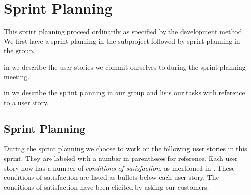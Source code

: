 \chapter{Sprint Planning}\label{chap:s4_sprintplanning}
This sprint planning proceed ordinarily as specified by the development method. We first have a sprint planning in the subproject followed by sprint planning in the group.

\begin{chapterorganization}
  \item in  we describe the user stories we commit ourselves to during the \bd sprint planning meeting.
  \item in  we describe the sprint planning in our group and lists our tasks with reference to a user story.
\end{chapterorganization}

\section{\bdtitle Sprint Planning}\label{sec:S4_bd}
During the \bd sprint planning we choose to work on the following user stories in this sprint. They are labeled with a number in parentheses for reference. Each user story now has a number of \emph{conditions of satisfaction}, as mentioned in . These conditions of satisfaction are listed as bullets below each user story. The conditions of satisfaction have been elicited by asking our customers. 

